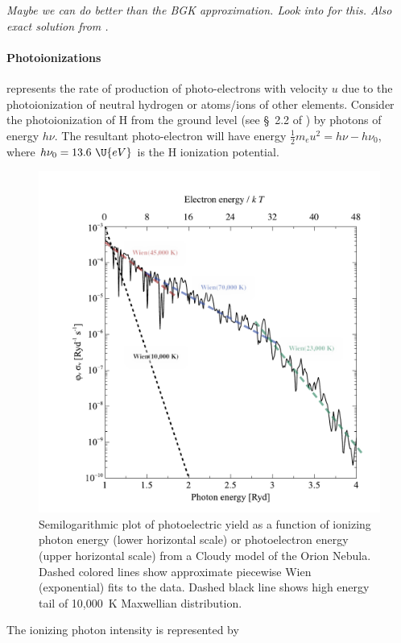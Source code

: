 \documentclass{emulateapj}
\begin{document}
\textit{Maybe we can do better than the BGK approximation.  Look into
  \citet{Gould:1971a, Gould:1976a} for this.  Also exact solution from
  \citet{Manservisi:2004a}. 
}

\paragraph{Photoionizations}  represents the rate of
production of photo-electrons with velocity \(u\) due to the
photoionization of neutral hydrogen or atoms/ions of other elements.
Consider the photoionization of H from the ground level (see \S~2.2 of
\citealp{2006agna.book.....O}) by photons of energy \(h\nu\).
The resultant photo-electron will have energy \(\frac12 m_e u^2 = h\nu
- h\nu_0\), where \(h\nu_0 = 13.6~\U{eV}\) is the H ionization
potential.  
\begin{figure}[tp]
  \centering
  \includegraphics[width=0.9\linewidth]{edited-photoelectron-yield-orion}
  \caption{Semilogarithmic plot of photoelectric yield as a function
    of ionizing photon energy (lower horizontal scale) or
    photoelectron energy (upper horizontal scale) from a Cloudy model
    of the Orion Nebula.  Dashed colored lines show approximate
    piecewise Wien (exponential) fits to the data.  Dashed black line
    shows high energy tail of 10,000~K Maxwellian distribution.}
  \label{fig:photoelec}
\end{figure}%
The ionizing photon intensity is represented by 
\end{document}
